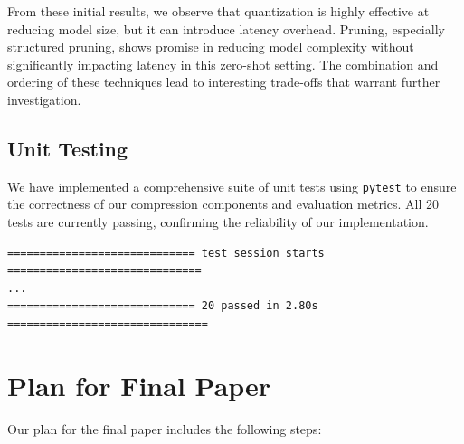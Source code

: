 \documentclass[sigconf]{acmart}
\begin{document}
From these initial results, we observe that quantization is highly effective at reducing model size, but it can introduce latency overhead. Pruning, especially structured pruning, shows promise in reducing model complexity without significantly impacting latency in this zero-shot setting. The combination and ordering of these techniques lead to interesting trade-offs that warrant further investigation.

\subsection{Unit Testing}
We have implemented a comprehensive suite of unit tests using \texttt{pytest} to ensure the correctness of our compression components and evaluation metrics. All 20 tests are currently passing, confirming the reliability of our implementation.

\begin{lstlisting}
============================= test session starts ==============================
...
============================= 20 passed in 2.80s ===============================
\end{lstlisting}

\section{Plan for Final Paper}
Our plan for the final paper includes the following steps:
\end{document}
